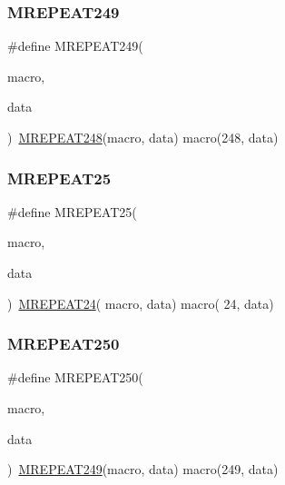 \mbox{\label{group__group__sam0__utils__mrepeat_ga09e41b2792e87e2db97093c344127c3d}} 
\subsubsection{\texorpdfstring{MREPEAT249}{MREPEAT249}}
{\footnotesize\ttfamily \#define M\+R\+E\+P\+E\+A\+T249(\begin{DoxyParamCaption}\item[{}]{macro,  }\item[{}]{data }\end{DoxyParamCaption})~\mbox{\hyperlink{group__group__sam0__utils__mrepeat_ga0bee84ef9cc1bc4f81563c8fc476fed4}{M\+R\+E\+P\+E\+A\+T248}}(macro, data)   macro(248, data)}

\mbox{\label{group__group__sam0__utils__mrepeat_ga10a7a74d8723d1fd28cdc2b0509854d2}} 
\subsubsection{\texorpdfstring{MREPEAT25}{MREPEAT25}}
{\footnotesize\ttfamily \#define M\+R\+E\+P\+E\+A\+T25(\begin{DoxyParamCaption}\item[{}]{macro,  }\item[{}]{data }\end{DoxyParamCaption})~\mbox{\hyperlink{group__group__sam0__utils__mrepeat_gaa40f282e37901ebbaac8b42af65e02fb}{M\+R\+E\+P\+E\+A\+T24}}( macro, data)   macro( 24, data)}

\mbox{\label{group__group__sam0__utils__mrepeat_ga35656197f887f34430287ec13dc48193}} 
\subsubsection{\texorpdfstring{MREPEAT250}{MREPEAT250}}
{\footnotesize\ttfamily \#define M\+R\+E\+P\+E\+A\+T250(\begin{DoxyParamCaption}\item[{}]{macro,  }\item[{}]{data }\end{DoxyParamCaption})~\mbox{\hyperlink{group__group__sam0__utils__mrepeat_ga09e41b2792e87e2db97093c344127c3d}{M\+R\+E\+P\+E\+A\+T249}}(macro, data)   macro(249, data)}

